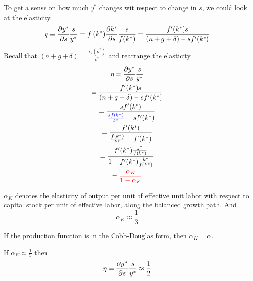 \documentclass[11pt]{article}
\begin{document}
			\par To get a sense on how much $y^*$ changes wit respect to change in $s$, we could look at the \ul{elasticity}.
			\begin{equation}
				\eta \equiv \frac{\partial{y^*}}{\partial{s}}\frac{s}{y^*} = f'(k^*) \frac{\partial{k^*}}{\partial{s}} \frac{s}{f(k^*)} = \frac{f'(k^*)s}{(n+g+\delta) - sf'(k^*)}
			\end{equation}
			Recall that $(n+g+\delta) = \frac{sf(k^*)}{k^*}$ and rearrange the elasticity
			\begin{gather}
				\eta = \frac{\partial{y^*}}{\partial{s}}\frac{s}{y^*} \\
				= \frac{f'(k^*)s}{(n+g+\delta) - sf'(k^*)} \\
				= \frac{s f'(k^*)}{\textcolor{blue}{\frac{s f(k^*)}{k^*}} - sf'(k^*)} \\
				= \frac{f'(k^*)}{\frac{f(k^*)}{k^*} - f'(k^*)} \\
				= \frac{f'(k^*) \frac{k^*}{f(k^*)}}{1 - f'(k^*)\frac{k^*}{f(k^*)}} \\
				= \textcolor{red}{
					\frac{\alpha_K}{1 - \alpha_K}
					}
			\end{gather}
			
			\begin{remark}
				$\alpha_K$ denotes the \ul{elasticity of output per unit of effective unit labor with respect to capital stock per unit of effective labor}, along the balanced growth path. And
				\[
					\alpha_K \approx \frac{1}{3}
				\]
			\end{remark}
			
			\begin{remark}
				If the production function is in the Cobb-Douglas form, then $\alpha_K = \alpha$.
			\end{remark}
			
			\begin{example}
				If $\alpha_K \approx \frac{1}{3}$ then \[\eta = \frac{\partial{y^*}}{\partial{s}} \frac{s}{y^*} \approx \frac{1}{2}\]
			\end{example}
			
\end{document}
